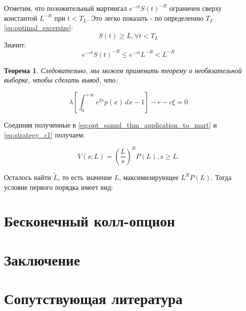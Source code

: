 \documentclass[a4paper,12pt]{article}
\newtheorem{theorem}{Теорема}
\theoremstyle{definition}
\begin{document}
Отметим, что положительный мартингал $e^{-rt} S(t)^{-R}$ ограничен сверху константой $L^{-R}$ при $t < T_L$. Это легко показать - по определению $T_L$ \eqref{eq:optimal_excersize}:
\begin{equation*}
S(t) \ge L, \forall t < T_L
\end{equation*}
Значит:
\begin{equation*}
e^{-rt}S(t)^{-R} \le e^{-rt}L^{-R} < L^{-R}
\end{equation*}


\begin{theorem}
Следовательно, мы можем применить теорему о необязательной выборке, чтобы сделать вывод, что:

\begin{equation}\label{eq:opt_sampl_thm_application_to_mart}
\lambda \left[ \int_{0}^{+\infty} e^{\xi x} p(x) \,dx - 1  \right] - r - c \xi = 0
\end{equation}
\end{theorem}

Соединяя полученные в \eqref{eq:opt_sampl_thm_application_to_mart} и \eqref{eq:strategy_c1} получаем:

\begin{equation}\label{eq:strategy_c1_simplified}
V(s; L) = \left(\frac{L}{s}\right)^{R} P(L), s \ge L.
\end{equation}

Осталось найти $\widetilde{L}$, то есть значение $L$, максимизирующее $L^{R} P(L)$. Тогда условие первого порядка имеет вид:

\section{Бесконечный колл-опцион}

\section{Заключение}

\section{Сопутствующая литература}
\end{document}
